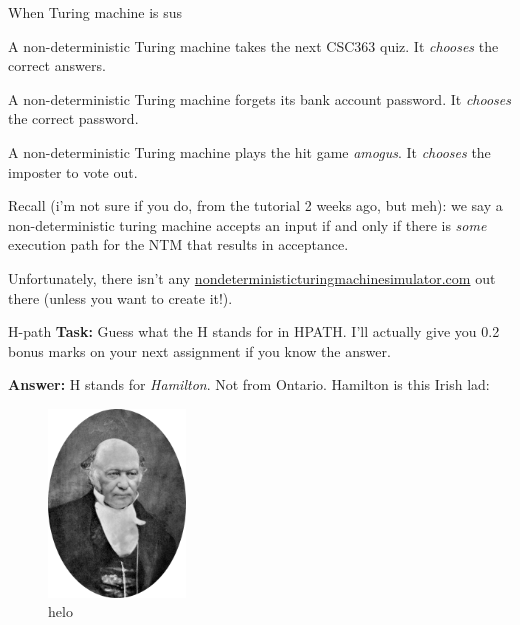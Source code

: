 \documentclass{beamer}
\begin{document}
\begin{frame}{When Turing machine is sus \emojiflushed \emojiflushed}

A non-deterministic Turing machine takes the next CSC363 quiz. It \textit{chooses} the correct answers.

\vspace{2mm}

A non-deterministic Turing machine forgets its bank account password. It \textit{chooses} the correct password.

\vspace{2mm}

A non-deterministic Turing machine plays the hit game \textit{amogus}. It \textit{chooses} the imposter to vote out.

\vspace{2mm}

\pause

Recall (i'm not sure if you do, from the tutorial 2 weeks ago, but meh): we say a non-deterministic turing machine accepts an input if and only if there is \textit{some} execution path for the NTM that results in acceptance.

\vspace{2mm}

Unfortunately, there isn't any \url{nondeterministicturingmachinesimulator.com} out there (unless you want to create it!). 

\end{frame}

\begin{frame}{H-path}
\textbf{Task:} Guess what the H stands for in HPATH. I'll actually give you 0.2 bonus marks on your next assignment if you know the answer.

\pause

\textbf{Answer:} H stands for \textit{Hamilton}. Not from Ontario. Hamilton is this Irish lad:

\begin{figure}[h]
\centering
\includegraphics[height=5cm]{img/hamilton.png}
\caption*{helo}
\end{figure}


\end{frame}
\end{document}
